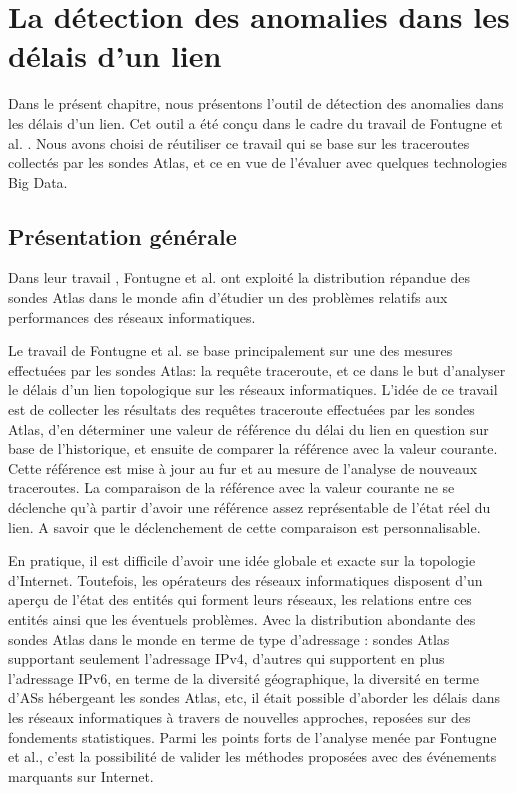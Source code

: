 \chapter{La détection des anomalies dans les délais d'un lien} \label{chap:algorith-detection}

Dans le présent chapitre, nous présentons l'outil de détection des anomalies dans les délais d'un lien. Cet outil a été  conçu dans le cadre du travail   de  Fontugne et al. \cite{DBLP:journals/corr/FontugneAPB16}. Nous avons choisi de réutiliser ce travail qui se base sur les traceroutes collectés par les sondes Atlas, et ce en vue de l'évaluer avec quelques technologies  Big Data.   

\section{Présentation générale }

Dans leur travail \cite{DBLP:journals/corr/FontugneAPB16}, Fontugne et al. ont exploité la  distribution répandue des sondes Atlas dans le monde afin d'étudier un des problèmes relatifs aux performances des réseaux informatiques. 

Le travail de  Fontugne  et al. \cite{DBLP:journals/corr/FontugneAPB16} se base principalement sur une des mesures effectuées par les sondes Atlas: la requête traceroute, et ce dans le but  d'analyser le délais d'un lien topologique sur les réseaux informatiques. L'idée de ce travail est de collecter les résultats des requêtes traceroute effectuées par les sondes Atlas, d'en déterminer une valeur de référence du délai du lien en question sur base de l'historique, et ensuite de comparer la référence avec la valeur courante.  Cette référence est mise à jour au fur et au mesure de l'analyse de nouveaux traceroutes. 
La comparaison de la référence avec la valeur courante ne se déclenche qu'à partir d'avoir une référence assez représentable de l'état réel du lien. A savoir que le déclenchement de cette comparaison  est personnalisable.





En pratique, il est  difficile  d'avoir une idée globale et exacte sur la topologie d'Internet. Toutefois, les opérateurs des réseaux informatiques  disposent d'un aperçu de l'état des entités qui forment leurs réseaux, les relations entre ces entités ainsi que les éventuels problèmes. Avec la distribution abondante des sondes Atlas dans le monde en terme de type d'adressage : sondes Atlas supportant seulement l'adressage IPv4, d'autres qui supportent en plus l'adressage IPv6, en terme de  la diversité géographique, la diversité en terme d'ASs hébergeant les sondes Atlas, etc, il était  possible d'aborder  les délais dans les réseaux informatiques à travers de nouvelles approches, reposées sur des fondements statistiques. Parmi les points forts de l'analyse menée par  Fontugne et al., c'est la possibilité de valider les   méthodes proposées avec des événements  marquants sur Internet.

